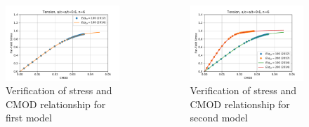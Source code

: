 \begin{frame}
\begin{columns}
\begin{column}{0.45\textwidth}
\begin{figure}[tbp]
\centering
\includegraphics[width=\columnwidth]{e100_verification}
\caption{\label{fig:e100_verification} Verification of stress and CMOD relationship for first model}
\end{figure}
\end{column}
\begin{column}{0.45\textwidth}
\begin{figure}[tbp]
\centering
\includegraphics[width=\columnwidth]{e100_200_verification}
\caption{\label{fig:e100_200_verification} Verification of stress and CMOD relationship for second model}
\end{figure}
\end{column}
\end{columns}
\end{frame}


